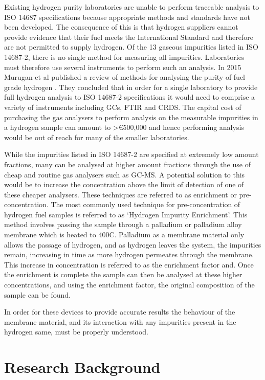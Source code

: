 Existing hydrogen purity laboratories are unable to perform traceable analysis to ISO 14687 
specifications because appropriate methods and standards have not been developed. The consequence 
of this is that hydrogen suppliers cannot provide evidence that their fuel meets the International 
Standard and therefore are not permitted to supply hydrogen. Of the 13 gaseous impurities listed in 
ISO 14687-2, there is no single method for measuring all impurities. Laboratories must therefore use 
several instruments to perform such an analysis.  In 2015 Murugan et al published a review of methods 
for analysing the purity of fuel grade hydrogen \cite{Murugan2015}. They concluded that in order for a single 
laboratory to provide full hydrogen analysis to ISO 14687-2 specifications it would need to comprise 
a variety of instruments including GCs, FTIR and CRDS. The capital cost of purchasing the gas 
analysers to perform analysis on the measurable impurities in a hydrogen sample can amount to 
>€500,000 \cite{Murugan2015} and hence performing analysis would be out of reach for many of the smaller 
laboratories. 

While the impurities listed in ISO 14687-2 are specified at extremely low amount fractions, 
many can be analysed at higher amount fractions through the use of cheap and routine gas 
analysers such as GC-MS. A potential solution to this would be to increase the concentration 
above the limit of detection of one of these cheaper analysers. These techniques are referred 
to as enrichment or pre-concentration. The most commonly used technique for pre-concentration 
of hydrogen fuel samples is referred to as ‘Hydrogen Impurity Enrichment’.  This method involves 
passing the sample through a palladium or palladium alloy membrane which is heated to 400\textdegree C. 
Palladium as a membrane material only allows the passage of hydrogen, and as hydrogen leaves the system, 
the impurities remain, increasing in time as more hydrogen permeates through the membrane.
This increase in concentration is referred to as the enrichment factor and. 
Once the enrichment is complete the sample can then be analysed at these higher concentrations, 
and using the enrichment factor, the original composition of the sample can be found. 

In order for these devices to provide accurate results the behaviour of the membrane material, and its interaction with any impurities present in the hydrogen same, must be properly understood.  


\section{Research Background}
